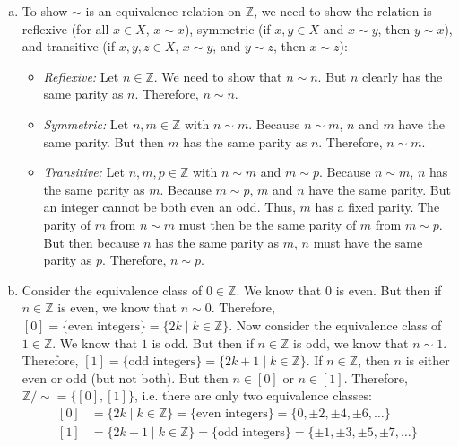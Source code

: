 \documentclass[11pt,letterpaper]{article}
\begin{document}
\sol 
\begin{enumerate}[(a)]
\item To show $\sim$ is an equivalence relation on $\mathbb{Z}$, we need to show the relation is reflexive (for all $x \in X$, $x \sim x$), symmetric (if $x, y \in X$ and $x \sim y$, then $y \sim x$), and transitive (if $x, y, z \in X$, $x \sim y$, and $y \sim z$, then $x \sim z$):
	\begin{itemize}
	\item \textit{Reflexive:} Let $n \in \mathbb{Z}$. We need to show that $n \sim n$. But $n$ clearly has the same parity as $n$. Therefore, $n \sim n$.  
	
	\item \textit{Symmetric:} Let $n, m \in \mathbb{Z}$ with $n \sim m$. Because $n \sim m$, $n$ and $m$ have the same parity. But then $m$ has the same parity as $n$. Therefore, $n \sim m$. 
	
	\item \textit{Transitive:} Let $n, m, p \in \mathbb{Z}$ with $n \sim m$ and $m \sim p$. Because $n \sim m$, $n$ has the same parity as $m$. Because $m \sim p$, $m$ and $n$ have the same parity. But an integer cannot be both even an odd. Thus, $m$ has a fixed parity. The parity of $m$ from $n \sim m$ must then be the same parity of $m$ from $m \sim p$. But then because $n$ has the same parity as $m$, $n$ must have the same parity as $p$. Therefore, $n \sim p$. 
	\end{itemize} \pspace

\item Consider the equivalence class of $0 \in \mathbb{Z}$. We know that $0$ is even. But then if $n \in \mathbb{Z}$ is even, we know that $n \sim 0$. Therefore, $[0]= \{ \text{even integers} \}= \{ 2k \mid k \in \mathbb{Z} \}$. Now consider the equivalence class of $1 \in \mathbb{Z}$. We know that $1$ is odd. But then if $n \in \mathbb{Z}$ is odd, we know that $n \sim 1$. Therefore, $[1]= \{ \text{odd integers} \}= \{ 2k + 1 \mid k \in \mathbb{Z} \}$. If $n \in \mathbb{Z}$, then $n$ is either even or odd (but not both). But then $n \in [0]$ or $n \in [1]$. Therefore, $\mathbb{Z} / \sim= \{ [0], [1] \}$, i.e. there are only two equivalence classes:
	\[
	\begin{aligned}
	[0]&= \{ 2k \mid k \in \mathbb{Z} \}= \{ \text{even integers} \}=  \{ 0, \pm 2, \pm 4, \pm 6, \ldots \} \\[0.3cm]
	[1]&= \{ 2k + 1 \mid k \in \mathbb{Z} \}= \{ \text{odd integers} \}= \{ \pm 1, \pm 3, \pm 5, \pm 7, \ldots \}
	\end{aligned}
	\]
\end{enumerate}
\end{document}
